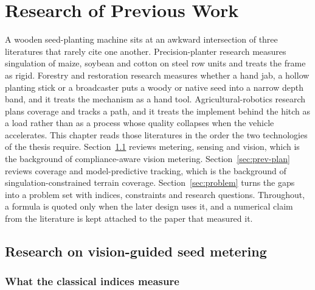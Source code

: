 \chapter{Research of Previous Work}
\label{ch:previous}

A wooden seed-planting machine sits at an awkward intersection of three literatures that rarely cite one another. Precision-planter research measures singulation of maize, soybean and cotton on steel row units and treats the frame as rigid. Forestry and restoration research measures whether a hand jab, a hollow planting stick or a broadcaster puts a woody or native seed into a narrow depth band, and it treats the mechanism as a hand tool. Agricultural-robotics research plans coverage and tracks a path, and it treats the implement behind the hitch as a load rather than as a process whose quality collapses when the vehicle accelerates. This chapter reads those literatures in the order the two technologies of the thesis require. Section~\ref{sec:prev-meter} reviews metering, sensing and vision, which is the background of compliance-aware vision metering. Section~\ref{sec:prev-plan} reviews coverage and model-predictive tracking, which is the background of singulation-constrained terrain coverage. Section~\ref{sec:problem} turns the gaps into a problem set with indices, constraints and research questions. Throughout, a formula is quoted only when the later design uses it, and a numerical claim from the literature is kept attached to the paper that measured it.

\section{Research on vision-guided seed metering}
\label{sec:prev-meter}

\subsection{What the classical indices measure}

